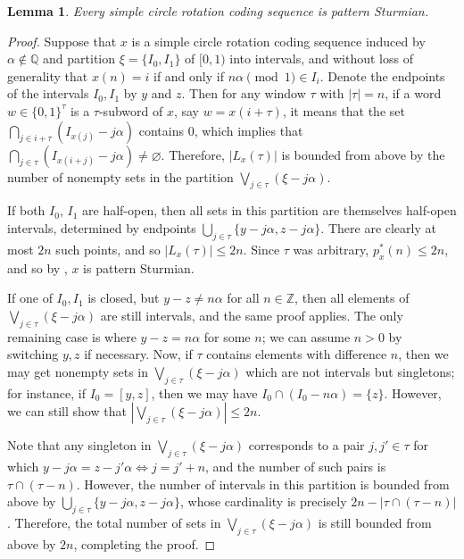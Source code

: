 \documentclass[11pt,reqno]{amsart}
\newtheorem{lemma}[theorem]{Lemma}
\theoremstyle{definition}
\theoremstyle{plain}
\newcommand{\Z}{\mathbb{Z}}
\begin{document}
\begin{lemma}\label{lem:simple_rotation_pattern_Sturmian}
    Every simple circle rotation coding sequence is pattern Sturmian.
\end{lemma}

\begin{proof}
Suppose that $x$ is a simple circle rotation coding sequence induced by $\alpha \notin \mathbb{Q}$ and partition 
$\xi = \{I_0, I_1\}$ of $[0,1)$ into intervals, and without loss of generality that $x(n) = i$ if and only if $n \alpha \pmod{1} \in I_i$. Denote the endpoints of the intervals $I_0, I_1$ by $y$ and $z$. Then for any window $\tau$ with $|\tau| = n$, if a word $w \in \{0,1\}^\tau$ is a $\tau$-subword of $x$, say $w = x(i+\tau)$, it means that the set 
$\bigcap_{j \in i + \tau} (I_{x(j)} - j\alpha)$ contains $0$, which implies that 
$\bigcap_{j \in \tau} (I_{x(i+j)} - j\alpha) \neq \varnothing$. Therefore, $|L_x(\tau)|$ is bounded from above by the number of nonempty sets in the partition $\bigvee_{j \in \tau} (\xi - j\alpha)$. 

If both $I_0$, $I_1$ are half-open, then all sets in this partition are themselves half-open intervals, determined by endpoints $\bigcup_{j \in \tau} \{y - j\alpha, z - j\alpha\}$. There are clearly at most $2n$ such points, and so $|L_x(\tau)| \leq 2n$. Since $\tau$ was arbitrary, $p^*_x(n) \leq 2n$, and so by , $x$ is pattern Sturmian.

If one of $I_0, I_1$ is closed, but $y - z \neq n\alpha$ for all $n \in \Z$, then all elements of $\bigvee_{j \in \tau} (\xi - j\alpha)$ are still intervals, and the same proof applies. The only remaining case is where
$y - z = n\alpha$ for some $n$; we can assume $n > 0$ by switching $y,z$ if necessary. Now, if $\tau$ contains elements with difference $n$, then we may get nonempty sets in $\bigvee_{j \in \tau} (\xi - j\alpha)$ which are not intervals but singletons; for instance, if $I_0 = [y, z]$, then we may have $I_0 \cap (I_0 - n\alpha) = \{z\}$. However, we can still show that $\left|\bigvee_{j \in \tau} (\xi - j\alpha)\right| \leq 2n$. 

Note that any singleton in $\bigvee_{j \in \tau} (\xi - j\alpha)$ corresponds to a pair $j, j' \in \tau$ for which 
$y - j\alpha = z - j'\alpha \Leftrightarrow j = j' + n$, and the number of such pairs is $\tau \cap (\tau - n)$. However, the number of intervals in this partition is bounded from above by $\bigcup_{j \in \tau} \{y - j\alpha, z - j\alpha\}$, whose cardinality is precisely $2n - |\tau \cap (\tau - n)|$. Therefore, the total number of sets in $\bigvee_{j \in \tau} (\xi - j\alpha)$ is still bounded from above by $2n$, completing the proof.
    
\end{proof}
\end{document}
